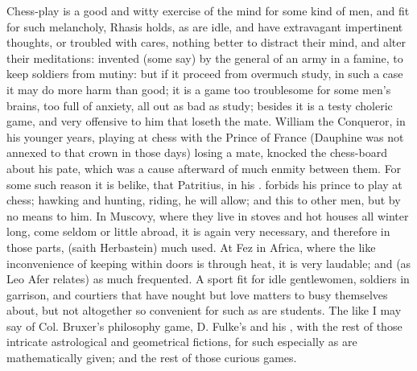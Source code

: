 {Chess-play is a good and witty exercise of the mind for some kind of men, and fit for such melancholy, Rhasis holds, as are idle, and have extravagant impertinent thoughts, or troubled with cares, nothing better to distract their mind, and alter their meditations: invented (some say) by the general of an army in a famine, to keep soldiers from mutiny: but if it proceed from overmuch study, in such a case it may do more harm than good; it is a game too troublesome for some men's brains, too full of anxiety, all out as bad as study; besides it is a testy choleric game, and very offensive to him that loseth the mate. William the Conqueror, in his younger years, playing at chess with the Prince of France (Dauphine was not annexed to that crown in those days) losing a mate, knocked the chess-board about his pate, which was a cause afterward of much enmity between them. For some such reason it is belike, that Patritius, in his . forbids his prince to play at chess; hawking and hunting, riding, \etc{} he will allow; and this to other men, but by no means to him. In Muscovy, where they live in stoves and hot houses all winter long, come seldom or little abroad, it is again very necessary, and therefore in those parts, (saith Herbastein) much used. At Fez in Africa, where the like inconvenience of keeping within doors is through heat, it is very laudable; and (as Leo Afer relates) as much frequented. A sport fit for idle gentlewomen, soldiers in garrison, and courtiers that have nought but love matters to busy themselves about, but not altogether so convenient for such as are students. The like I may say of Col. Bruxer's philosophy game, D. Fulke's  and his , with the rest of those intricate astrological and geometrical fictions, for such especially as are mathematically given; and the rest of those curious games.

}
